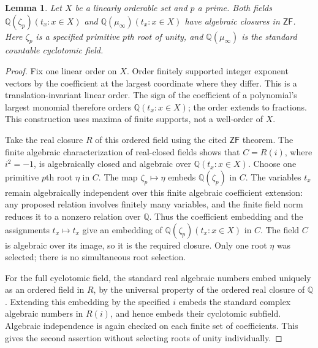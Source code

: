 \documentclass[11pt,a4paper]{article}
\newtheorem{lemma}[theorem]{Lemma}
\theoremstyle{definition}\newtheorem{definition}[theorem]{Definition}
\theoremstyle{remark}\newtheorem{remark}[theorem]{Remark}
\newcommand{\ZF}{\mathsf{ZF}}\newcommand{\ZFA}{\mathsf{ZFA}}
\newcommand{\Q}{\mathbb Q}\newcommand{\F}{\mathbb F}
\begin{document}
\begin{lemma}\label{lem:lo-rational-closure}
Let $X$ be a linearly orderable set and $p$ a prime.  Both fields
$\Q(\zeta_p)(t_x:x\in X)$ and
$\Q(\mu_\infty)(t_x:x\in X)$ have algebraic closures in $\ZF$.
Here $\zeta_p$ is a specified primitive $p$th root of unity, and
$\Q(\mu_\infty)$ is the standard countable cyclotomic field.
\end{lemma}
\begin{proof}
Fix one linear order on $X$.  Order finitely supported integer exponent
vectors by the coefficient at the largest coordinate where they differ.
This is a translation-invariant linear order.  The sign of the coefficient
of a polynomial's largest monomial therefore orders $\Q(t_x:x\in X)$;
the order extends to fractions.  This construction uses maxima of finite
supports, not a well-order of $X$.

Take the real closure $R$ of this ordered field using the cited $\ZF$
theorem.  The finite algebraic characterization of real-closed fields
shows that $C=R(i)$, where $i^2=-1$, is algebraically closed and algebraic
over $\Q(t_x:x\in X)$.
Choose one primitive $p$th root $\eta$ in $C$.  The map
$\zeta_p\mapsto\eta$ embeds $\Q(\zeta_p)$ in $C$.
The variables $t_x$ remain algebraically independent over this finite
algebraic coefficient extension: any proposed relation involves finitely
many variables, and the finite field norm reduces it to a nonzero relation
over $\Q$.  Thus the coefficient embedding and the assignments
$t_x\mapsto t_x$ give an embedding of $\Q(\zeta_p)(t_x:x\in X)$ in $C$.
The field $C$ is algebraic over its image, so it is the required closure.
Only one root $\eta$ was selected; there is no simultaneous root selection.

For the full cyclotomic field, the standard real algebraic numbers
embed uniquely as an ordered field in $R$, by the universal property of
the ordered real closure of $\Q$.  Extending this embedding by the
specified $i$ embeds the standard complex algebraic numbers in $R(i)$,
and hence embeds their cyclotomic subfield.  Algebraic independence is
again checked on each finite set of coefficients.  This gives the
second assertion without selecting roots of unity individually.
\end{proof}
\end{document}
